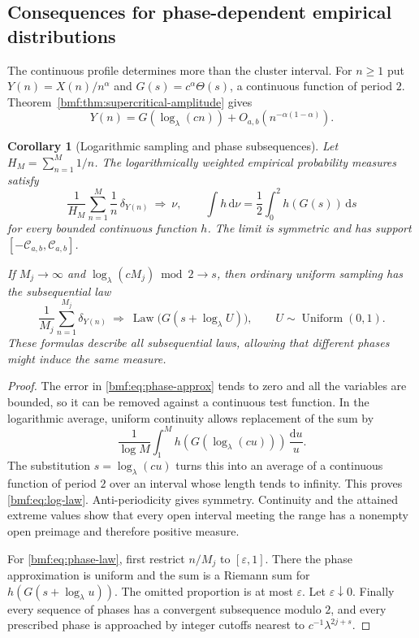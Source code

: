 \documentclass[11pt]{article}
\numberwithin{equation}{section}
\newtheorem{corollary}[theorem]{Corollary}
\theoremstyle{definition}
\theoremstyle{remark}
\begin{document}
\subsection{Consequences for phase-dependent empirical distributions}
\label{bmf:sec:phase-distributions}

The continuous profile determines more than the cluster interval.
For $n\geq1$ put $Y(n)=X(n)/n^\alpha$ and
$G(s)=c^\alpha\Theta(s)$, a continuous function of period $2$.
Theorem~\ref{bmf:thm:supercritical-amplitude} gives
\begin{equation}\label{bmf:eq:phase-approx}
 Y(n)=G(\log_\lambda(cn))+O_{a,b}(n^{-\alpha(1-\alpha)}).
\end{equation}

\begin{corollary}[Logarithmic sampling and phase subsequences]
\label{bmf:cor:phase-laws}
Let $H_M=\sum_{n=1}^{M}1/n$. The logarithmically weighted
empirical probability measures satisfy
\begin{equation}\label{bmf:eq:log-law}
 \frac1{H_M}\sum_{n=1}^{M}\frac1n\,\delta_{Y(n)}
 \ \Longrightarrow\ \nu,\qquad
 \int h\,\mathrm d\nu=\frac12\int_0^2h(G(s))\,\mathrm ds
\end{equation}
for every bounded continuous function $h$.
The limit is symmetric and has support
$[-\mathcal C_{a,b},\mathcal C_{a,b}]$.

If $M_j\to\infty$ and
$\log_\lambda(cM_j)\bmod2\to s$, then ordinary uniform sampling
has the subsequential law
\begin{equation}\label{bmf:eq:phase-law}
 \frac1{M_j}\sum_{n=1}^{M_j}\delta_{Y(n)}
 \ \Longrightarrow\
 \operatorname{Law}\bigl(G(s+\log_\lambda U)\bigr),
 \qquad U\sim\operatorname{Uniform}(0,1).
\end{equation}
These formulas describe all subsequential laws, allowing that
different phases might induce the same measure.
\end{corollary}
\begin{proof}
The error in \eqref{bmf:eq:phase-approx} tends to zero and all the
variables are bounded, so it can be removed against a continuous
test function. In the logarithmic average, uniform continuity
allows replacement of the sum by
\[
 \frac1{\log M}\int_1^M
     h(G(\log_\lambda(cu)))\,\frac{\mathrm du}{u}.
\]
The substitution $s=\log_\lambda(cu)$ turns this into an average
of a continuous function of period $2$ over an interval whose
length tends to infinity. This proves \eqref{bmf:eq:log-law}.
Anti-periodicity gives symmetry. Continuity and the attained
extreme values show that every open interval meeting the range
has a nonempty open preimage and therefore positive measure.

For \eqref{bmf:eq:phase-law}, first restrict $n/M_j$ to $[\varepsilon,1]$.
There the phase approximation is uniform and the sum is a Riemann
sum for $h(G(s+\log_\lambda u))$. The omitted proportion is at
most $\varepsilon$. Let $\varepsilon\downarrow0$.
Finally every sequence of phases has a convergent subsequence
modulo $2$, and every prescribed phase is approached by integer
cutoffs nearest to $c^{-1}\lambda^{2j+s}$.
\end{proof}
\end{document}
